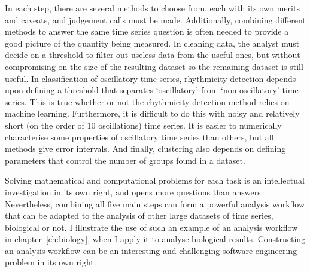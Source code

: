 In each step, there are several methods to choose from, each with its own merits and caveats, and judgement calls must be made.
Additionally, combining different methods to answer the same time series question is often needed to provide a good picture of the quantity being measured.
In cleaning data, the analyst must decide on a threshold to filter out useless data from the useful ones, but without compromising on the size of the resulting dataset so the remaining dataset is still useful.
In classification of oscillatory time series, rhythmicity detection depends upon defining a threshold that separates `oscillatory' from `non-oscillatory' time series.
This is true whether or not the rhythmicity detection method relies on machine learning.
Furthermore, it is difficult to do this with noisy and relatively short (on the order of 10 oscillations) time series.
It is easier to numerically characterise some properties of oscillatory time series than others, but all methods give error intervals.
And finally, clustering also depends on defining parameters that control the number of groups found in a dataset.

Solving mathematical and computational problems for each task is an intellectual investigation in its own right, and opens more questions than answers.
Nevertheless, combining all five main steps can form a powerful analysis workflow that can be adapted to the analysis of other large datasets of time series, biological or not.
I illustrate the use of such an example of an analysis workflow in chapter~\ref{ch:biology}, when I apply it to analyse biological results.
Constructing an analysis workflow can be an interesting and challenging software engineering problem in its own right.
